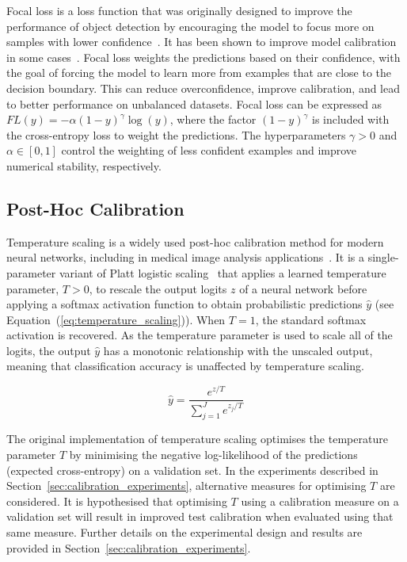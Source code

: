 Focal loss is a loss function that was originally designed to improve the performance of object detection by encouraging the model to focus more on samples with lower confidence~\citep{lin2017focal}. It has been shown to improve model calibration in some cases~\citep{mukhoti2020calibrating}. Focal loss weights the predictions based on their confidence, with the goal of forcing the model to learn more from examples that are close to the decision boundary. This can reduce overconfidence, improve calibration, and lead to better performance on unbalanced datasets. Focal loss can be expressed as $FL(y) = -\alpha(1-y)^\gamma\log(y)$, where the factor $(1-y)^\gamma$ is included with the cross-entropy loss to weight the predictions. The hyperparameters $\gamma > 0$ and $\alpha \in [0, 1]$ control the weighting of less confident examples and improve numerical stability, respectively.


\subsection{Post-Hoc Calibration}
\label{subsec:post_hoc_calibration}
Temperature scaling is a widely used post-hoc calibration method for modern neural networks, including in medical image analysis applications~\citep{guo2017calibration,liang2020improved}. It is a single-parameter variant of Platt logistic scaling~\citep{platt1999probabilistic} that applies a learned temperature parameter, $T > 0$, to rescale the output logits $z$ of a neural network before applying a softmax activation function to obtain probabilistic predictions $\hat{y}$ (see Equation~(\ref{eq:temperature_scaling})). When $T=1$, the standard softmax activation is recovered. As the temperature parameter is used to scale all of the logits, the output $\hat{y}$ has a monotonic relationship with the unscaled output, meaning that classification accuracy is unaffected by temperature scaling.

\begin{equation}
	\hat{y} = \frac{e^{z/T}}{\sum^{J}_{j=1}e^{z_j/T}}
	\label{eq:temperature_scaling}
\end{equation}

The original implementation of temperature scaling optimises the temperature parameter $T$ by minimising the negative log-likelihood of the predictions (expected cross-entropy) on a validation set. In the experiments described in Section~\ref{sec:calibration_experiments}, alternative measures for optimising $T$ are considered. It is hypothesised that optimising $T$ using a calibration measure on a validation set will result in improved test calibration when evaluated using that same measure. Further details on the experimental design and results are provided in Section~\ref{sec:calibration_experiments}.



